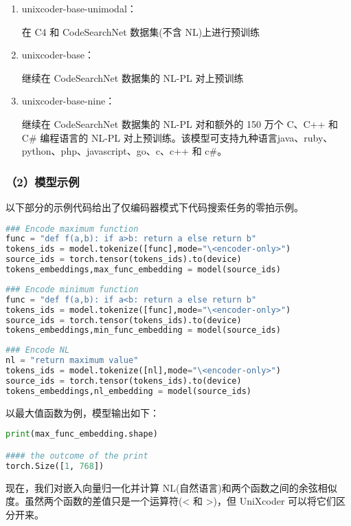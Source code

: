 \documentclass[12pt]{article}
\begin{document}
\begin{enumerate}
      \item
            unixcoder-base-unimodal：

            在 C4 和 CodeSearchNet 数据集(不含
            NL)上进行预训练
      \item
            unixcoder-base：

            继续在 CodeSearchNet 数据集的 NL-PL 对上预训练
      \item
            unixcoder-base-nine：

            继续在 CodeSearchNet 数据集的 NL-PL 对和额外的
            150 万个 C、C++ 和 C\# 编程语言的 NL-PL
            对上预训练。该模型可支持九种语言java、ruby、python、php、javascript、go、c、c++
            和 c\#。
\end{enumerate}

\subsubsection*{（2）模型示例}

以下部分的示例代码给出了仅编码器模式下代码搜索任务的零拍示例。
\begin{lstlisting}[language=Python]
### Encode maximum function
func = "def f(a,b): if a>b: return a else return b"
tokens_ids = model.tokenize([func],mode="\<encoder-only>")
source_ids = torch.tensor(tokens_ids).to(device)
tokens_embeddings,max_func_embedding = model(source_ids)
\end{lstlisting}
\begin{lstlisting}[language=Python]
### Encode minimum function
func = "def f(a,b): if a<b: return a else return b"
tokens_ids = model.tokenize([func],mode="\<encoder-only>")
source_ids = torch.tensor(tokens_ids).to(device)
tokens_embeddings,min_func_embedding = model(source_ids)
\end{lstlisting}
\begin{lstlisting}[language=Python]
### Encode NL
nl = "return maximum value"
tokens_ids = model.tokenize([nl],mode="\<encoder-only>")
source_ids = torch.tensor(tokens_ids).to(device)
tokens_embeddings,nl_embedding = model(source_ids)
\end{lstlisting}
以最大值函数为例，模型输出如下：
\begin{lstlisting}[language=Python]
print(max_func_embedding.shape)

#### the outcome of the print
torch.Size([1, 768])
\end{lstlisting}
现在，我们对嵌入向量归一化并计算 NL(自然语言)和两个函数之间的余弦相似度。虽然两个函数的差值只是一个运算符(\textless{}
和 \textgreater)，但 UniXcoder 可以将它们区分开来。
\end{document}
